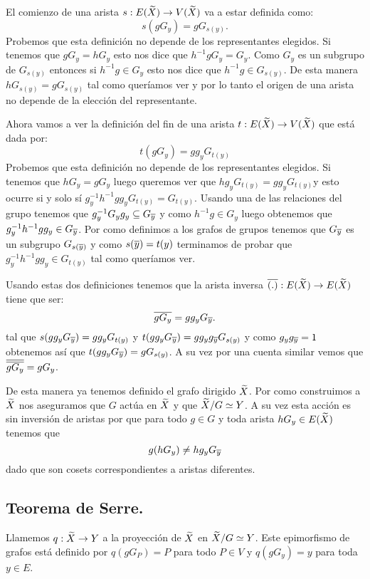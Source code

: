 \documentclass[tesis.tex]{subfiles}
\begin{document}
El comienzo de una arista $s:E(\widetilde X) \to V(\widetilde X)$ va a estar definida como:
\[
s(gG_{y}) = gG_{s(y)}.
\]
Probemos que esta definición no depende de los representantes elegidos.
Si tenemos que $gG_{y} = hG_{y}$ esto nos dice que $h^{-1}gG_{y} = G_{y}$.
Como $G_{y}$ es un subgrupo de $G_{s(y)}$ entonces si $h^{-1}g \in G_y$ esto nos dice que $h^{-1}g \in G_{s(y)}$.
De esta manera $hG_{s(y)} = gG_{s(y)}$ tal como queríamos ver y por lo tanto el origen de una arista no depende de la elección del representante.


Ahora vamos a ver la definición del fin de una arista $t:E(\widetilde X) \to V(\widetilde X)$ que está dada por:
\[
t(gG_{y}) = gg_{y}G_{t(y)}
\]
Probemos que esta definición no depende de los representantes elegidos.
Si tenemos que $hG_{y} = gG_{y}$ luego queremos ver que $hg_{y}G_{t(y)} = gg_{y}G_{t(y)}$y esto ocurre si y solo sí $g^{-1}_y h^{-1}g g_{y} G_{t(y)} = G_{t(y)}$.
Usando una de las relaciones del grupo tenemos que $g_{y}^{-1} G_{y} g_{y} \subseteq G_{\overline y}$ y como $h^{-1}g \in G_{y}$ luego obtenemos que $g^{-1}_y h^{-1}g g_{y} \in G_{\overline y}$.
Por como definimos a los grafos de grupos tenemos que $G_{\overline y}$ es un subgrupo $G_{s(\overline y)}$ y como $s(\overline y) = t(y)$ terminamos de probar que $g^{-1}_y h^{-1}g g_{y} \in G_{t(y)}$ tal como queríamos ver.


Usando estas dos definiciones tenemos que la arista inversa $\overline{(.)}:E(\widetilde X) \to E(\widetilde X)$ tiene que ser:
\[
\overline{gG_{y}} = gg_{y} G_{\overline y}.
\]
tal que $s(gg_{y}G_{\overline y}) = gg_{y}G_{t(y)}$ y $t(gg_{y}G_{\overline y}) = gg_{y}g_{\overline y}G_{s(y)}$ y como $g_{y}g_{\overline y} = 1$ obtenemos así que $t(gg_{y}G_{\overline y}) = gG_{s(y)}$.
A su vez por una cuenta similar vemos que $\overline{\overline{gG_{y}}} = gG_{y}$.

De esta manera ya tenemos definido el grafo dirigido $\widetilde X$.
Por como construimos a $\widetilde X$ nos aseguramos que $G$ actúa en $\widetilde X$ y que $\widetilde X / G \simeq Y$.
A su vez esta acción es sin inversión de aristas por que para todo $g \in G$ y toda arista $hG_{y} \in E(\widetilde X)$ tenemos que
\[
g (hG_{y}) \neq hg_{y}G_{\overline{y}}
\]
dado que son cosets correspondientes a aristas diferentes.

\subsection{Teorema de Serre.}



Llamemos $q:\widetilde X \to Y$ a la proyección de $\widetilde X$ en $\widetilde X / G \simeq Y$.
Este epimorfismo de grafos está definido por 
$q(gG_{P}) = P$ para todo $P \in V$ y 
$q(gG_{y}) = y$ para toda $y \in E$.
\end{document}
